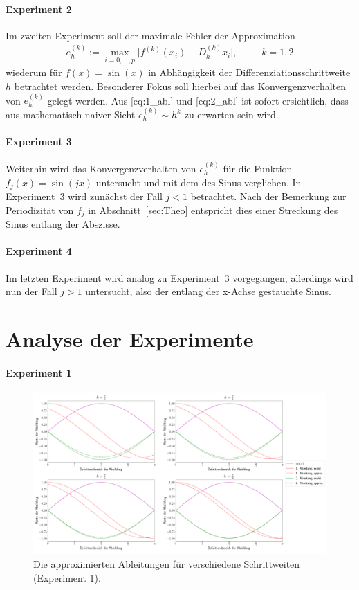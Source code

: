 \documentclass[smallheadings]{scrartcl}
\begin{document}
\paragraph{Experiment 2}
Im zweiten Experiment soll der maximale Fehler der Approximation 
\begin{align}
e_h^{(k)}:=\max\limits_{i=0,\dots,p}\vert f^{(k)}(x_i)-D_h^{(k)}x_i\vert\text{,~~~~~~~~}k=1,2
\end{align}
wiederum für $f(x)=\sin(x)$ in Abhängigkeit der Differenziationsschrittweite $h$ betrachtet werden. Besonderer Fokus soll hierbei auf das Konvergenzverhalten von $e_h^{(k)}$ gelegt werden. Aus \eqref{eq:1_abl} und \eqref{eq:2_abl} ist sofort ersichtlich, dass aus mathematisch naiver Sicht $e_h^{(k)}\sim h^k$ zu erwarten sein wird. 

\paragraph{Experiment 3}
Weiterhin wird das Konvergenzverhalten von $e_h^{(k)}$ für die Funktion $f_j(x)=\sin(jx)$ untersucht und mit dem des Sinus verglichen. In Experiment~3 wird zunächst der Fall $j<1$ betrachtet. Nach der Bemerkung zur Periodizität von $f_j$ in Abschnitt~\ref{sec:Theo} entspricht dies einer Streckung des Sinus entlang der Abszisse.

\paragraph{Experiment 4}
Im letzten Experiment wird analog zu Experiment~3 vorgegangen, allerdings wird nun der Fall $j>1$ untersucht, also der entlang der x-Achse gestauchte Sinus.


\section{Analyse der Experimente}

\paragraph{Experiment 1}

\begin{figure}[H]
	\includegraphics[width=\linewidth]{Bilder/fkt_abb.png}
	\caption{Die approximierten Ableitungen für verschiedene Schrittweiten (Experiment 1).}
	\label{im:ablplot}
\end{figure}
\end{document}
